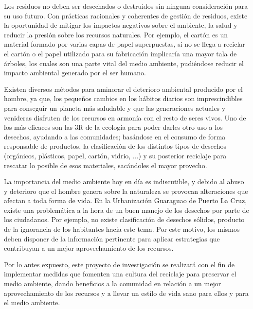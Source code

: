 Los residuos no deben ser desechados o destruidos sin ninguna consideración para su uso futuro. Con prácticas racionales y coherentes de gestión de residuos, existe la oportunidad de mitigar los impactos negativos sobre el ambiente, la salud y reducir la presión sobre los recursos naturales. Por ejemplo, el cartón es un material formado por varias capas de papel superpuestas, si no se llega a reciclar el cartón o el papel utilizado para su fabricación implicaría una mayor tala de árboles, los cuales son una parte vital del medio ambiente, pudiéndose reducir el impacto ambiental generado por el ser humano.

Existen diversos métodos para aminorar el deterioro ambiental producido por el hombre, ya que, los pequeños cambios en los hábitos diarios son imprescindibles para conseguir un planeta más saludable y que las generaciones actuales y venideras disfruten de los recursos en armonía con el resto de seres vivos. Uno de los más eficaces son las 3R de la ecología para poder darles otro uso a los desechos, ayudando a las comunidades; basándose en el consumo de forma responsable de productos, la clasificación de los distintos tipos de desechos (orgánicos, plásticos, papel, cartón, vidrio, ...) y su posterior reciclaje para rescatar lo posible de esos materiales, sacándoles el mayor provecho.

 La importancia del medio ambiente hoy en día es indiscutible, y debido al abuso y deterioro que el hombre genera sobre la naturaleza se provocan alteraciones que afectan a toda forma de vida. En la Urbanización Guaraguao de Puerto La Cruz, existe una problemática a la hora de un buen manejo de los desechos por parte de los ciudadanos. Por ejemplo, no existe clasificación de desechos sólidos, producto de la ignorancia de los habitantes hacia este tema. Por este motivo, los mismos deben disponer de la información pertinente para aplicar estrategias que contribuyan a un mejor aprovechamiento de los recursos.

Por lo antes expuesto, este proyecto de investigación se realizará con el fin de implementar medidas que fomenten una cultura del reciclaje para preservar el medio ambiente, dando beneficios a la comunidad en relación a un mejor aprovechamiento de los recursos y a llevar un estilo de vida sano para ellos y para el medio ambiente. 

\newpage
